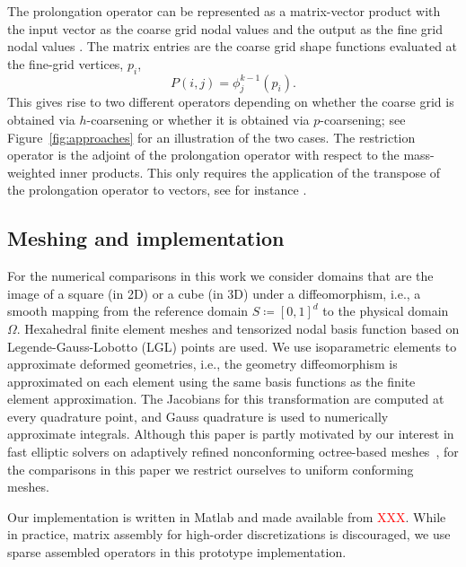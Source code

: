 \documentclass[smallcondensed,final]{svjour3}     %
\newcommand{\todo}[1]{\textcolor{red}{ #1}}
\begin{document}
The prolongation operator can be represented as a matrix-vector
product with the input vector as the coarse grid nodal values and the
output as the fine grid nodal values \cite{SampathBiros10}. The matrix
entries are the coarse grid shape functions evaluated at the fine-grid
vertices, $p_i$,
\begin{equation}
	\label{eq:Pstencil}
	P(i,j) = \phi_j^{k-1}(p_i). 
\end{equation}
This gives rise to two different operators depending on whether the
coarse grid is obtained via $h$-coarsening or whether it is obtained
via $p$-coarsening; see Figure~\ref{fig:approaches} for an
illustration of the two cases. The restriction operator is the adjoint
of the prolongation operator with respect to the mass-weighted inner
products. This only requires the application of the transpose of the
prolongation operator to vectors, see for instance
\cite{SampathBiros10}.


\subsection{Meshing and implementation} %
\label{sub:meshing}

For the numerical comparisons in this work we consider domains that
are the image of a square (in 2D) or a cube (in 3D) under a
diffeomorphism, i.e., a smooth mapping from the reference domain
$S\coloneqq[0,1]^d$ to the physical domain $\Omega$. Hexahedral finite
element meshes and tensorized nodal basis function based on
Legende-Gauss-Lobotto (LGL) points are used.  We use isoparametric
elements to approximate deformed geometries, i.e., the geometry
diffeomorphism is approximated on each element using the same basis
functions as the
finite element approximation. The Jacobians for this transformation
are computed at every quadrature point, and Gauss quadrature is used
to numerically approximate integrals.  Although this paper is partly
motivated by our interest in fast elliptic solvers on adaptively
refined nonconforming octree-based
meshes~\cite{SundarBirosBursteddeEtAl12, SampathBiros10}, for the
comparisons in this paper
we restrict ourselves to uniform conforming meshes.

Our implementation is written in Matlab and made available from
\todo{XXX}. While in practice, matrix assembly for
high-order discretizations is discouraged, we use sparse
assembled operators in this prototype implementation.
\end{document}

